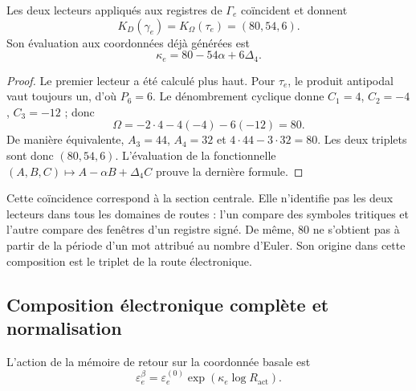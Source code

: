 \begin{theorem}
Les deux lecteurs appliqués aux registres de \(\Gamma_e\) coïncident et donnent
\begin{equation}
 K_D(\gamma_e)=K_\Omega(\tau_e)=(80,54,6).
 \label{x_reciprocidad:eq:el-triple}
\end{equation}
Son évaluation aux coordonnées déjà générées est
\begin{equation}
 \kappa_e=80-54\alpha+6\Delta_4.
 \label{x_reciprocidad:eq:el-kappa}
\end{equation}
\end{theorem}
\begin{proof}
Le premier lecteur a été calculé plus haut. Pour \(\tau_e\), le produit
antipodal vaut toujours un, d'où \(P_6=6\). Le dénombrement cyclique donne
\(C_1=4\), \(C_2=-4\), \(C_3=-12\) ; donc
\[
 \Omega=-2\cdot4-4(-4)-6(-12)=80.
\]
De manière équivalente, \(A_3=44\), \(A_4=32\) et \(4\cdot44-3\cdot32=80\). Les deux triplets sont donc \((80,54,6)\). L'évaluation de la fonctionnelle \((A,B,C)\mapsto A-\alpha B+\Delta_4C\) prouve la dernière formule.
\end{proof}

Cette coïncidence correspond à la section centrale. Elle n'identifie pas les deux lecteurs dans tous les domaines de routes : l'un compare des symboles tritiques et l'autre compare des fenêtres d'un registre signé. De même, \(80\) ne s'obtient pas à partir de la période d'un mot attribué au nombre d'Euler. Son origine dans cette composition est le triplet de la route électronique.

\subsection{Composition électronique complète et normalisation}

\begin{definition}
L'action de la mémoire de retour sur la coordonnée basale est
\begin{equation}
 \varepsilon_e^\beta
 =\varepsilon_e^{(0)}\exp\!\left(\kappa_e\log R_{\mathrm{act}}\right).
 \label{x_reciprocidad:eq:el-beta}
\end{equation}
\end{definition}

